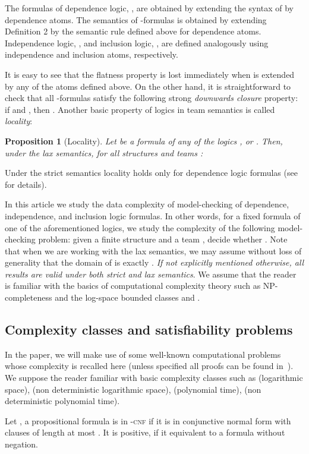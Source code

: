 \documentclass{article}
\theoremstyle{plain}
\newtheorem{proposition}[theorem]{Proposition}
\theoremstyle{definition}
\newcommand{\pb}[1]{\textsc{#1}}
\begin{document}
The formulas of dependence logic, , are obtained by extending the syntax of  by dependence atoms. The semantics of -formulas is obtained by extending Definition 2 by the semantic rule defined above for dependence atoms.  Independence logic, , and inclusion logic, , are defined analogously using independence and inclusion atoms, respectively.


It is easy to see that the flatness property is lost immediately when  is extended by any of the atoms defined above. On the other hand,  it is straightforward to check that all -formulas satisfy the following  strong \emph{downwards closure} property:  if  and   , then .
Another basic property of logics in team semantics is called \emph{locality}:
\begin{proposition}[Locality]
Let   be a formula of any of the logics  ,   or . Then, under the lax semantics, for all structures    and teams  :
 
\end{proposition}
Under the strict semantics locality  holds only for dependence logic formulas (see \cite{galliani12} for details).

In this article we study the  data complexity  of model-checking  of dependence, independence, and inclusion logic formulas. In other words, for a fixed formula  of one of the aforementioned logics, we study the complexity of the following model-checking  problem:  given a finite structure   and a team ,  decide whether . 
Note that when we are working with the lax semantics, we may assume without loss of generality that the  domain of  is exactly . \emph{If not explicitly mentioned otherwise, all  results are valid under both strict and lax semantics}.
We assume that the reader is familiar with the basics of computational 
complexity theory such as NP-completeness and the log-space bounded classes  and .

\subsection{Complexity classes and satisfiability problems}

In the paper, we will make use of some well-known computational problems whose complexity is recalled here (unless specified all proofs can be found in~\cite{GareyJ1979}). We suppose the reader familiar with basic complexity classes such as  (logarithmic space),  (non deterministic logarithmic space),  (polynomial time),  (non deterministic polynomial time).

Let , a propositional formula is in -\pb{cnf} if it is in conjunctive normal form with clauses of length at most . It is positive, if it equivalent to a formula without negation. 
\end{document}
